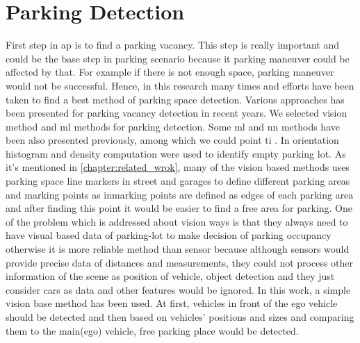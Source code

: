 \chapter{Parking Detection}\label{chapter:Parking Space Detection}
First step in \acrfull{ap} is to find a parking vacancy. This step is really important and could be the base step in parking scenario because it parking maneuver could be affected by that. For example if there is not enough space, parking maneuver would not be successful. Hence, in this research many times and efforts have been taken to find a best method of parking space detection. Various approaches has been presented for parking vacancy detection in recent years. We selected vision method and \acrlong{ml} methods for parking detection. Some \acrshort{ml} and \acrshort{nn} methods have been also presented previously, among which we could point ti \cite{histogramEOH}. In\cite{histogramEOH} orientation histogram and density computation were used to identify empty parking lot. As it's mentioned in \ref{chapter:related_wrok}, many of the vision based methods uses parking space line markers in street and garages to define different parking areas and marking points as in\cite{markingPointJournal}marking points are defined as edges of each parking area and after finding this point it would be easier to find a free area for parking. One of the problem which is addressed about vision ways is that they always need to have visual based data of parking-lot to make decision of parking occupancy otherwise it is more reliable method than sensor because although sensors would provide precise data of distances and measurements, they could not process other information of the scene as position of vehicle, object detection and they just consider cars as data and other features would be ignored. 
In this work, a simple vision base method has been used. At first, vehicles in front of the ego vehicle should be detected and then based on vehicles' positions and sizes and comparing them to the main(ego) vehicle, free parking place would be detected.
